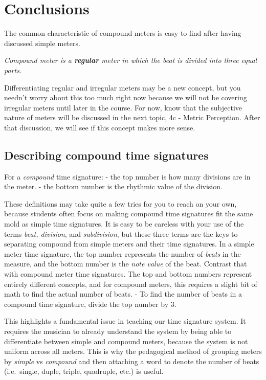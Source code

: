 \documentclass{book}
\begin{document}
\hypertarget{conclusions-28}{%
\section{Conclusions}\label{conclusions-28}}

The common characteristic of compound meters is easy to find after having
discussed simple meters.

\emph{Compound meter is a \textbf{regular} meter in which the beat is divided
into three equal parts.}

Differentiating regular and irregular meters may be a new concept, but you
needn't worry about this too much right now because we will not be covering
irregular meters until later in the course. For now, know that the subjective
nature of meters will be discussed in the next topic, 4c - Metric Perception.
After that discussion, we will see if this concept makes more sense.

\hypertarget{describing-compound-time-signatures}{%
\subsection{Describing compound time
signatures}\label{describing-compound-time-signatures}}

For a \emph{compound} time signature: - the top number is how many divisions
are in the meter. - the bottom number is the rhythmic value of the division.

These definitions may take quite a few tries for you to reach on your own,
because students often focus on making compound time signatures fit the same
mold as simple time signatures. It is easy to be careless with your use of the
terms \emph{beat, division}, and \emph{subdivision}, but these three terms are
the keys to separating compound from simple meters and their time signatures.
In a simple meter time signature, the top number represents the number of
\emph{beats} in the measure, and the bottom number is the \emph{note value} of
the beat. Contrast that with compound meter time signatures. The top and
bottom numbers represent entirely different concepts, and for compound meters,
this requires a slight bit of math to find the actual number of beats. - To
find the number of beats in a compound time signature, divide the top number
by 3.

This highlights a fundamental issue in teaching our time signature system. It
requires the musician to already understand the system by being able to
differentiate between simple and compound meters, because the system is not
uniform across all meters. This is why the pedagogical method of grouping
meters by \emph{simple} vs \emph{compound} and then attaching a word to denote
the number of beats (i.e.~single, duple, triple, quadruple, etc.) is useful.
\end{document}

